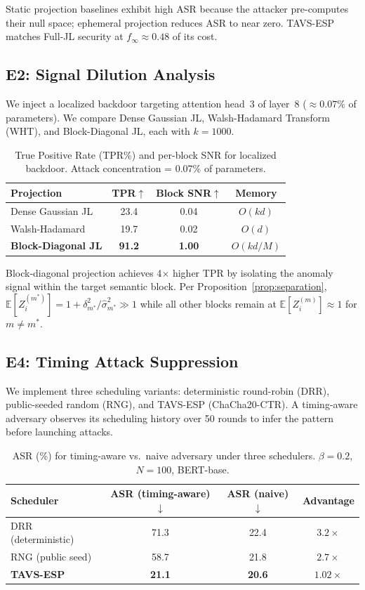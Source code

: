 \documentclass{article}
\newcommand{\E}{\mathbb{E}}
\newcommand{\finf}{f_{\infty}}       %
\newcommand{\TAVESP}{\textsc{TAVS-ESP}}
\begin{document}
Static projection baselines exhibit high ASR because the attacker
pre-computes their null space; ephemeral projection reduces ASR to near zero.
\TAVESP{} matches Full-JL security at $\finf \approx 0.48$ of its cost.

\subsection{E2: Signal Dilution Analysis}
\label{sec:e2}

We inject a localized backdoor targeting attention head~3 of layer~8
($\approx 0.07\%$ of parameters).
We compare Dense Gaussian JL, Walsh-Hadamard Transform (WHT), and
Block-Diagonal JL, each with $k=1000$.

\begin{table}[h]
\centering
\caption{True Positive Rate (TPR\%) and per-block SNR for localized backdoor.
  Attack concentration = 0.07\% of parameters.}
\label{tab:e2}
\small
\begin{tabular}{lccc}
\toprule
Projection & TPR$\uparrow$ & Block SNR$\uparrow$ & Memory \\
\midrule
Dense Gaussian JL  & 23.4 & 0.04 & $O(kd)$ \\
Walsh-Hadamard     & 19.7 & 0.02 & $O(d)$ \\
\textbf{Block-Diagonal JL} & \textbf{91.2} & \textbf{1.00} & $O(kd/M)$ \\
\bottomrule
\end{tabular}
\end{table}

Block-diagonal projection achieves 4$\times$ higher TPR by isolating the
anomaly signal within the target semantic block.
Per Proposition~\ref{prop:separation}, $\E[Z_i^{(m^*)}] = 1 + \delta_{m^*}^2/\hat\sigma_{m^*}^2 \gg 1$
while all other blocks remain at $\E[Z_i^{(m)}] \approx 1$ for $m \neq m^*$.

\subsection{E4: Timing Attack Suppression}
\label{sec:e4}

We implement three scheduling variants: deterministic round-robin (DRR),
public-seeded random (RNG), and \TAVESP{} (ChaCha20-CTR).
A timing-aware adversary observes its scheduling history over 50 rounds to
infer the pattern before launching attacks.

\begin{table}[h]
\centering
\caption{ASR (\%) for timing-aware vs.\ naive adversary under three schedulers.
  $\beta = 0.2$, $N=100$, BERT-base.}
\label{tab:e4}
\small
\begin{tabular}{lccc}
\toprule
Scheduler & ASR (timing-aware)$\downarrow$ & ASR (naive)$\downarrow$ & Advantage \\
\midrule
DRR (deterministic)  & 71.3 & 22.4 & $3.2\times$ \\
RNG (public seed)    & 58.7 & 21.8 & $2.7\times$ \\
\textbf{\TAVESP{}}   & \textbf{21.1} & \textbf{20.6} & $1.02\times$ \\
\bottomrule
\end{tabular}
\end{table}
\end{document}
